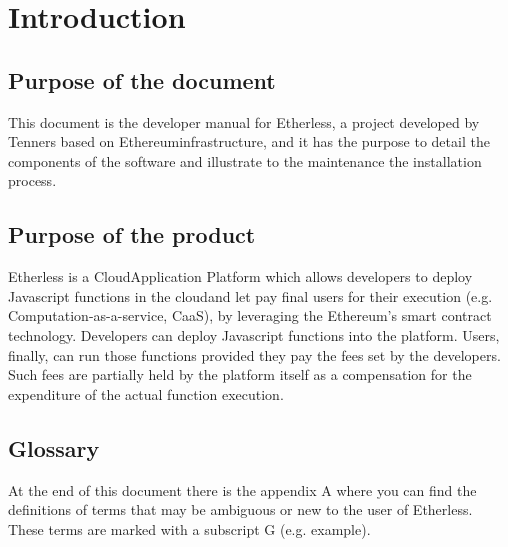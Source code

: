 \section{Introduction}

\subsection{Purpose of the document}
This document is the developer manual for Etherless, a project developed by Tenners based on Ethereum\glo infrastructure, and it has the purpose to detail the components of the software and illustrate to the maintenance the installation process.

\subsection{Purpose of the product}
Etherless is a Cloud\glo Application Platform which allows developers to deploy Javascript functions in the cloud\glo and let pay final users for their execution (e.g. Computation-as-a-service, CaaS), by leveraging the Ethereum\glos's smart contract technology. Developers can deploy Javascript functions into the platform. Users, finally, can run those functions provided they pay the fees set by the developers. Such fees are partially held by the platform itself as a compensation for the expenditure of the actual function execution.

\subsection{Glossary}
At the end of this document there is the appendix A where you can find the definitions of terms that may be ambiguous or new to the user of Etherless. These terms are marked with a subscript G (e.g. example\glos).

%
